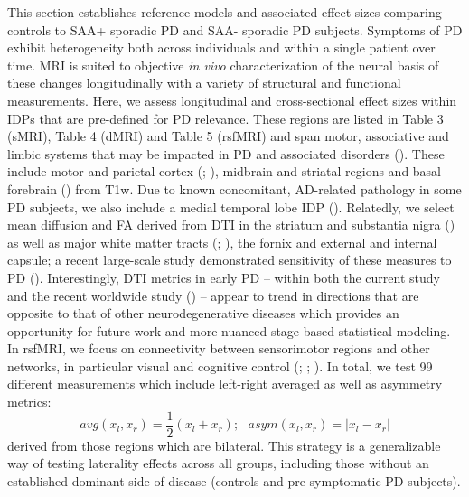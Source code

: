 \documentclass[
  table]{article}
\begin{document}
This section establishes reference models and associated effect sizes
comparing controls to SAA+ sporadic PD and SAA- sporadic PD subjects.
Symptoms of PD exhibit heterogeneity both across individuals and within
a single patient over time. MRI is suited to objective \emph{in vivo}
characterization of the neural basis of these changes longitudinally
with a variety of structural and functional measurements. Here, we
assess longitudinal and cross-sectional effect sizes within IDPs that
are pre-defined for PD relevance. These regions are listed in Table 3
(sMRI), Table 4 (dMRI) and Table 5 (rsfMRI) and span motor, associative
and limbic systems that may be impacted in PD and associated disorders
(). These include
motor and parietal cortex
(;
),
midbrain and striatal regions and basal forebrain
() from T1w. Due
to known concomitant, AD-related pathology in some PD subjects, we also
include a medial temporal lobe IDP
().
Relatedly, we select mean diffusion and FA derived from DTI in the
striatum and substantia nigra () as well as major white matter tracts
(;
), the
fornix and external and internal capsule; a recent large-scale study
demonstrated sensitivity of these measures to PD
().
Interestingly, DTI metrics in early PD -- within both the current study
and the recent worldwide study
()
-- appear to trend in directions that are opposite to that of other
neurodegenerative diseases which provides an opportunity for future work
and more nuanced stage-based statistical modeling. In rsfMRI, we focus
on connectivity between sensorimotor regions and other networks, in
particular visual and cognitive control
(;
;
). In
total, we test 99 different measurements which include left-right
averaged as well as asymmetry metrics: \[
avg(x_l,x_r)=\frac{1}{2}(x_l+x_r);~~~asym(x_l,x_r)=|x_l-x_r|
\] derived from those regions which are bilateral. This strategy is a
generalizable way of testing laterality effects across all groups,
including those without an established dominant side of disease
(controls and pre-symptomatic PD subjects).
\end{document}
